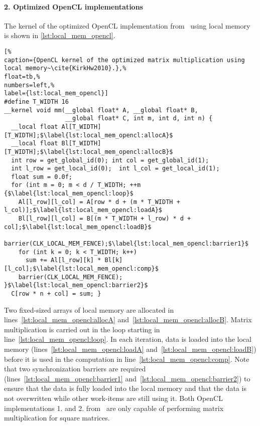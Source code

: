 \paragraph{2. Optimized OpenCL implementations}
The kernel of the optimized OpenCL implementation from~\cite{KirkHw2010} using local memory is shown in \autoref{lst:local_mem_opencl}.
\begin{lstlisting}[%                                                             
caption={OpenCL kernel of the optimized matrix multiplication using local memory~\cite{KirkHw2010}.},%
float=tb,%
numbers=left,%
label={lst:local_mem_opencl}]
#define T_WIDTH 16
__kernel void mm(__global float* A, __global float* B,
                 __global float* C, int m, int d, int n) {
  __local float Al[T_WIDTH][T_WIDTH];$\label{lst:local_mem_opencl:allocA}$
  __local float Bl[T_WIDTH][T_WIDTH];$\label{lst:local_mem_opencl:allocB}$
  int row = get_global_id(0); int col = get_global_id(1);
  int l_row = get_local_id(0);  int l_col = get_local_id(1);
  float sum = 0.0f;
  for (int m = 0; m < d / T_WIDTH; ++m {$\label{lst:local_mem_opencl:loop}$
    Al[l_row][l_col] = A[row * d + (m * T_WIDTH + l_col)];$\label{lst:local_mem_opencl:loadA}$
    Bl[l_row][l_col] = B[(m * T_WIDTH + l_row) * d + col];$\label{lst:local_mem_opencl:loadB}$
    barrier(CLK_LOCAL_MEM_FENCE);$\label{lst:local_mem_opencl:barrier1}$
    for (int k = 0; k < T_WIDTH; k++)
      sum += Al[l_row][k] * Bl[k][l_col];$\label{lst:local_mem_opencl:comp}$
    barrier(CLK_LOCAL_MEM_FENCE); }$\label{lst:local_mem_opencl:barrier2}$
  C[row * n + col] = sum; }
\end{lstlisting}
Two fixed-sized arrays of local memory are allocated in lines~\ref{lst:local_mem_opencl:allocA} and~\ref{lst:local_mem_opencl:allocB}.
Matrix multiplication is carried out in the loop starting in line~\ref{lst:local_mem_opencl:loop}.
In each iteration, data is loaded into the local memory (lines~\ref{lst:local_mem_opencl:loadA} and~\ref{lst:local_mem_opencl:loadB}) before it is used in the computation in line~\ref{lst:local_mem_opencl:comp}.
Note that two synchronization barriers are required (lines~\ref{lst:local_mem_opencl:barrier1} and~\ref{lst:local_mem_opencl:barrier2}) to ensure that the data is fully loaded into the local memory and that the data is not overwritten while other work-items are still using it.
Both OpenCL implementations 1. and 2. from~\cite{KirkHw2010} are only capable of performing matrix multiplication for square matrices.

\vspace{-.5em}
